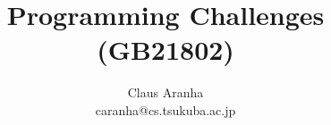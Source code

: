 \beamertemplatenavigationsymbolsempty




\usepackage[english]{babel}
\usepackage{CJKutf8}
\usepackage{subfigure}

\usepackage{times}
\usepackage[T1]{fontenc}

\makepagenote
\renewcommand{\notenumintext}[1]{}
\newcommand{\ppagenote}[1]{\pagenote[Page \insertframenumber]{#1}}

\title[Programming Challenges (GB21802)]{Programming Challenges (GB21802)}
\author[Claus Aranha]{Claus Aranha\\{\footnotesize caranha@cs.tsukuba.ac.jp}}
